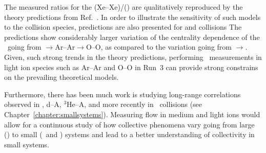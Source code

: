 The measured ratios for the \vn(Xe--Xe)/\vn(\pbpb) are qualitatively reproduced 
  by the theory predictions from Ref.~\cite{Giacalone:2017dud}.
In order to illustrate the sensitivity of such models to the collision species, 
  predictions are also presented for \ArAr and \OO collisions
The predictions show considerably larger variation of the centrality dependence
  of the \vn\ going from \xexe$\rightarrow$Ar--Ar$\rightarrow$O--O, as compared to
  the variation going from \pbpb$\rightarrow$\xexe.
Given, such strong trends in the theory predictions, performing \vn\ measurements 
  in light ion species such as Ar--Ar and O--O in Run~3 can provide strong 
  constrains on the prevailing theoretical models.

Furthermore, there has been much work is studying long-range correlations
  observed in \pA, d--A, $^{3}\mathrm{He}$--A, and more recently in 
  \pp\ collisions (see Chapter~\ref{chapter:smallsystems}).
Measuring flow in medium and light ions would allow for a continuous study 
  of how collective phenomena vary going from large (\pbpb) to small 
  (\pA\ and \pp) systems and lead to a better understanding of collectivity
  in small systems.


